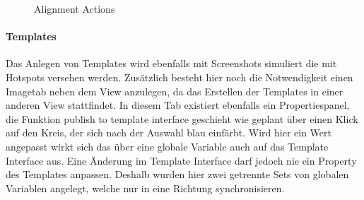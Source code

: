 \begin{figure}%
\centering
{}%
\qquad
{}%

\caption{Alignment Actions}%
\label{fig:Prototyp_06}
\end{figure}

\paragraph{Templates}
Das Anlegen von Templates wird ebenfalls mit Screenshots simuliert die mit Hotspots versehen werden.
Zusätzlich besteht hier noch die Notwendigkeit einen Imagetab neben dem View anzulegen, da das Erstellen der Templates in einer anderen View stattfindet.
In diesem Tab existiert ebenfalls ein Propertiespanel, die Funktion \glqq publish to template interface\grqq{} geschieht wie geplant über einen Klick auf den Kreis, der sich nach der Auswahl blau einfärbt.
Wird hier ein Wert angepasst wirkt sich das über eine globale Variable auch auf das Template Interface aus.
Eine Änderung im Template Interface darf jedoch nie ein Property des Templates anpassen.
Deshalb wurden hier zwei getrennte Sets von globalen Variablen angelegt, welche nur in eine Richtung synchronisieren.

